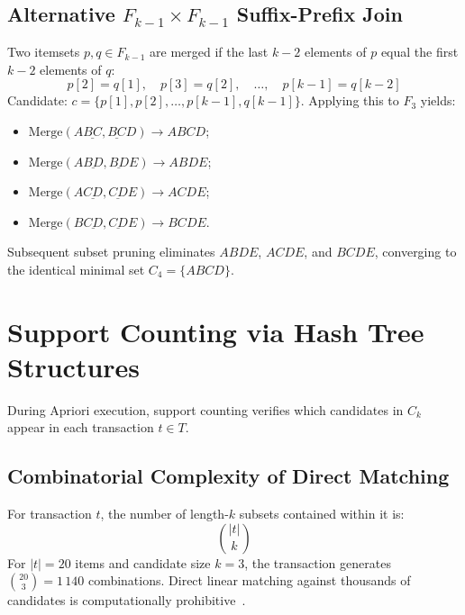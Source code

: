 \subsection{Alternative $F_{k-1} \times F_{k-1}$ Suffix-Prefix Join}
Two itemsets $p, q \in F_{k-1}$ are merged if the last $k-2$ elements of $p$ equal the first $k-2$ elements of $q$:
\begin{equation}
\label{eq:dm-suffix-prefix-condition-en}
p[2] = q[1], \quad p[3] = q[2], \quad \dots, \quad p[k-1] = q[k-2]
\end{equation}
Candidate: $c = \{p[1], p[2], \dots, p[k-1], q[k-1]\}$.
Applying this to $F_3$ yields:
\begin{itemize}[noitemsep]
    \item $\mathrm{Merge}(A\underline{BC}, \underline{BC}D) \rightarrow ABCD$;
    \item $\mathrm{Merge}(A\underline{BD}, \underline{BD}E) \rightarrow ABDE$;
    \item $\mathrm{Merge}(A\underline{CD}, \underline{CD}E) \rightarrow ACDE$;
    \item $\mathrm{Merge}(B\underline{CD}, \underline{CD}E) \rightarrow BCDE$.
\end{itemize}
Subsequent subset pruning eliminates $ABDE$, $ACDE$, and $BCDE$, converging to the identical minimal set $C_4 = \{ABCD\}$.

\section{Support Counting via Hash Tree Structures}
\label{sec:dm-hash-tree-counting}

During Apriori execution, support counting verifies which candidates in $C_k$ appear in each transaction $t \in T$.

\subsection{Combinatorial Complexity of Direct Matching}
For transaction $t$, the number of length-$k$ subsets contained within it is:
\begin{equation}
\binom{|t|}{k}
\end{equation}
For $|t| = 20$ items and candidate size $k=3$, the transaction generates $\binom{20}{3} = 1\,140$ combinations. Direct linear matching against thousands of candidates is computationally prohibitive~\cite{tan2018}.

